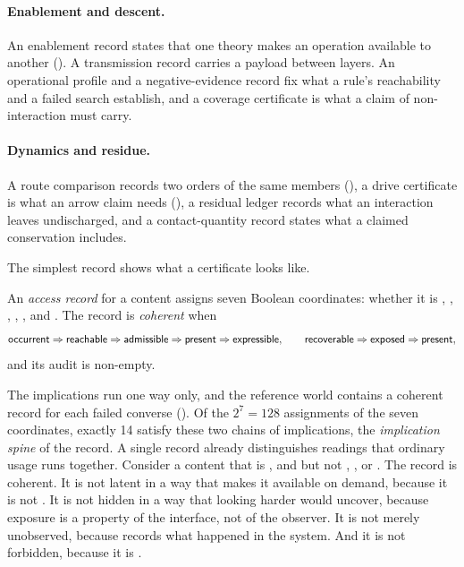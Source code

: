 \paragraph{Enablement and descent.} An enablement record states that one theory makes an
operation available to another (). A transmission record carries a
payload between layers. An operational profile and a negative-evidence record fix what a
rule's reachability and a failed search establish, and a coverage certificate is what a
claim of non-interaction must carry.

\paragraph{Dynamics and residue.} A route comparison records two orders of the same
members (), a drive certificate is what an arrow claim needs
(), a residual ledger records what an interaction leaves undischarged, and a
contact-quantity record states what a claimed conservation includes.

The simplest record shows what a certificate looks like.

\begin{definition}
\label{def:access}
An \emph{access record} for a content assigns seven Boolean coordinates: whether it is
\expressible, \present, \exposed, \recoverable, \admissible, \reachable{} and
\occurrent. The record is \emph{coherent} when
\[
  \textsf{occurrent}\Rightarrow\textsf{reachable}\Rightarrow\textsf{admissible}\Rightarrow\textsf{present}\Rightarrow
  \textsf{expressible},
  \qquad
  \textsf{recoverable}\Rightarrow\textsf{exposed}\Rightarrow\textsf{present},
\]
and its audit is non-empty.
\end{definition}

The implications run one way only, and the reference world contains a coherent record for
each failed converse (). Of the $2^7=128$ assignments of the seven
coordinates, exactly 14 satisfy these two chains of implications, the
\emph{implication spine} of the record. A single record already distinguishes readings that ordinary usage runs
together. Consider a content that is \expressible, \present{} and \admissible{} but not
\exposed, \recoverable, \reachable{} or \occurrent. The record is coherent. It is not
latent in a way that makes it available on demand, because it is not \reachable. It is not
hidden in a way that looking harder would uncover, because exposure is a property of the
interface, not of the observer. It is not merely unobserved, because \occurrent{} records
what happened in the system. And it is not forbidden, because it is \admissible.

